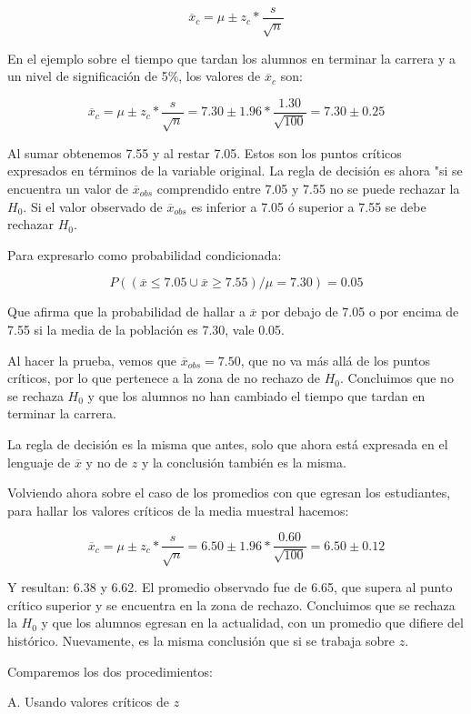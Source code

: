 \documentclass[]{book}
\begin{document}
\[{\overline{x}}_{c} = \mu \pm z_{c}*\frac{s}{\sqrt{n}}\]

En el ejemplo sobre el tiempo que tardan los alumnos en terminar la
carrera y a un nivel de significación de 5\%, los valores de
\({\overline{x}}_{c}\) son:

\[{\overline{x}}_{c} = \mu \pm z_{c}*\frac{s}{\sqrt{n}} = 7.30 \pm 1.96*\frac{1.30}{\sqrt{100}} = 7.30 \pm 0.25\]

Al sumar obtenemos 7.55 y al restar 7.05. Estos son los puntos críticos
expresados en términos de la variable original. La regla de decisión es
ahora "si se encuentra un valor de \({\overline{x}}_{obs}\)
comprendido entre 7.05 y 7.55 no se puede rechazar la \(H_{0}\). Si el valor observado de \({\overline{x}}_{obs}\) es inferior a 7.05 ó superior
a 7.55 se debe rechazar \(H_{0}\).

Para expresarlo como probabilidad condicionada:

\[P((\overline{x} \leq 7.05 \cup \overline{x} \geq 7.55)/\mu=7.30)=0.05\]

Que afirma que la probabilidad de hallar a \(\overline{x}\) por debajo de
7.05 o por encima de 7.55 si la media de la población es 7.30, vale
0.05.

Al hacer la prueba, vemos que \({\overline{x}}_{obs} = 7.50\), que
no va más allá de los puntos críticos, por lo que pertenece a la zona de no rechazo de \(H_{0}\). Concluimos que no se rechaza \(H_{0}\) y que los alumnos no han cambiado el tiempo que tardan en terminar la carrera.

La regla de decisión es la misma que antes, solo que ahora está expresada en el lenguaje de \(\overline{x}\) y no de \(z\) y la conclusión también es la misma.

Volviendo ahora sobre el caso de los promedios con que egresan los
estudiantes, para hallar los valores críticos de la media muestral
hacemos:

\[{\overline{x}}_{c} = \mu \pm z_{c}*\frac{s}{\sqrt{n}} = 6.50 \pm 1.96*\frac{0.60}{\sqrt{100}} = 6.50 \pm 0.12\]

Y resultan: 6.38 y 6.62. El promedio observado fue de 6.65, que supera
al punto crítico superior y se encuentra en la zona de rechazo.
Concluimos que se rechaza la \(H_{0}\) y que los alumnos egresan en la
actualidad, con un promedio que difiere del histórico. Nuevamente, es la misma conclusión que si se trabaja sobre \(z\).

Comparemos los dos procedimientos:

A. Usando valores críticos de \(z\)
\end{document}

